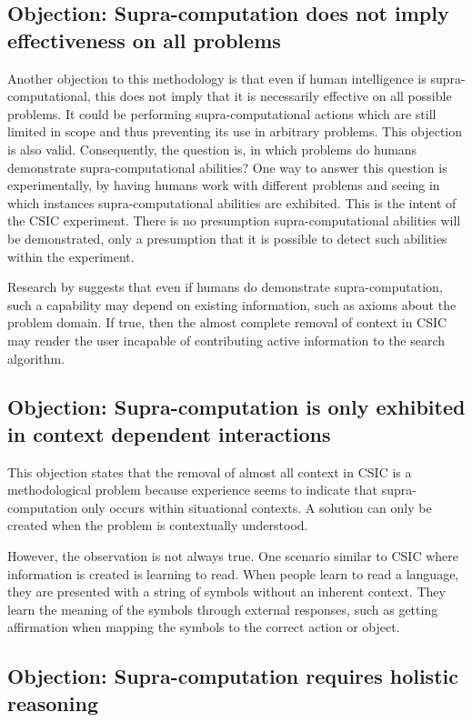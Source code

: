 \subsection{Objection: Supra-computation does not imply effectiveness on all problems}
Another objection to this methodology is that even if human intelligence is supra-computational, this does not imply that it is necessarily effective on all possible problems.  It could be performing supra-computational actions which are still limited in scope and thus preventing its use in arbitrary problems. This objection is also valid.  Consequently, the question is, in which problems do humans demonstrate supra-computational abilities?  One way to answer this question is experimentally, by having humans work with different problems and seeing in which instances supra-computational abilities are exhibited.  This is the intent of the CSIC experiment.  There is no presumption supra-computational abilities will be demonstrated, only a presumption that it is possible to detect such abilities within the experiment. 

Research by \citet{bartlett11:_using_turin_oracl_in_cognit_model} suggests that even if humans do demonstrate supra-computation, such a capability may depend on existing information, such as axioms about the problem domain.  If true, then the almost complete removal of context in CSIC may render the user incapable of contributing active information to the search algorithm.

\subsection{Objection: Supra-computation is only exhibited in context dependent interactions}

This objection states that the removal of almost all context in CSIC is a methodological problem because experience seems to indicate that supra-computation only occurs within situational contexts.  A solution can only be created when the problem is contextually understood.

However, the observation is not always true.  One scenario similar to CSIC where information is created is learning to read.  When people learn to read a language, they are presented with a string of symbols without an inherent context.  They learn the meaning of the symbols through external responses, such as getting affirmation when mapping the symbols to the correct action or object.

\subsection{Objection: Supra-computation requires holistic reasoning}

